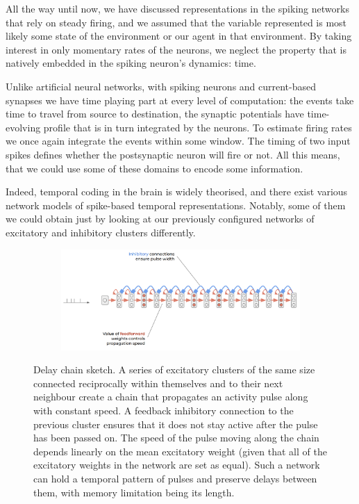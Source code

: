 
All the way until now, we have discussed representations in the spiking networks that rely on steady firing, and we assumed that the variable represented is most likely some state of the environment or our agent in that environment. By taking interest in only momentary rates of the neurons, we neglect the property that is natively embedded in the spiking neuron's dynamics: time.

Unlike artificial neural networks, with spiking neurons and current-based synapses we have time playing part at every level of computation: the events take time to travel from source to destination, the synaptic potentials have time-evolving profile that is in turn integrated by the neurons. To estimate firing rates we once again integrate the events within some window. The timing of two input spikes defines whether the postsynaptic neuron will fire or not. All this means, that we could use some of these domains to encode some information.

Indeed, temporal coding in the brain is widely theorised, and there exist various network models of spike-based temporal representations. Notably, some of them we could obtain just by looking at our previously configured networks of excitatory and inhibitory clusters differently.

\begin{figure}[h!]
  \centering
  \begin{subfigure}{\textwidth}
    \includegraphics[width=\linewidth]{img/chapter3/delay_chain_sketch.png}
    \caption{}
  \end{subfigure}
    \caption[Delay chain sketch]{Delay chain sketch. A series of excitatory clusters of the same size connected reciprocally within themselves and to their next neighbour create a chain that propagates an activity pulse along with constant speed. A feedback inhibitory connection to the previous cluster ensures that it does not stay active after the pulse has been passed on. The speed of the pulse moving along the chain depends linearly on the mean excitatory weight (given that all of the excitatory weights in the network are set as equal). Such a network can hold a temporal pattern of pulses and preserve delays between them, with memory limitation being its length.}
  \label{fig:delay_chain_sketch}
\end{figure}

